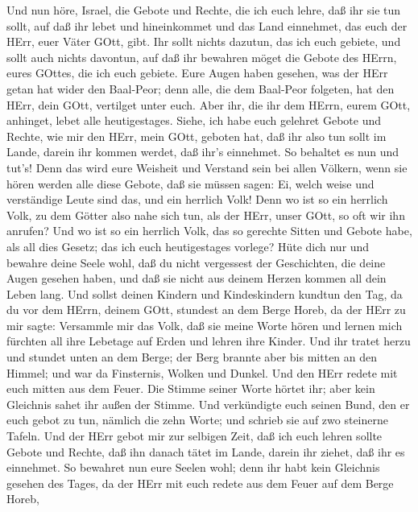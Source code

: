  Und nun höre, Israel, die Gebote und Rechte, die ich euch
lehre, daß ihr sie tun sollt, auf daß ihr lebet und hineinkommet und das
Land einnehmet, das euch der HErr, euer Väter GOtt, gibt. 
Ihr sollt nichts dazutun, das ich euch gebiete, und sollt auch nichts
davontun, auf daß ihr bewahren möget die Gebote des HErrn, eures GOttes,
die ich euch gebiete.  Eure Augen haben gesehen, was der
HErr getan hat wider den Baal-Peor; denn alle, die dem Baal-Peor
folgeten, hat den HErr, dein GOtt, vertilget unter euch. 
Aber ihr, die ihr dem HErrn, eurem GOtt, anhinget, lebet alle
heutigestages.  Siehe, ich habe euch gelehret Gebote und
Rechte, wie mir den HErr, mein GOtt, geboten hat, daß ihr also tun sollt
im Lande, darein ihr kommen werdet, daß ihr's einnehmet.  So
behaltet es nun und tut's! Denn das wird eure Weisheit und Verstand sein
bei allen Völkern, wenn sie hören werden alle diese Gebote, daß sie
müssen sagen: Ei, welch weise und verständige Leute sind das, und ein
herrlich Volk!  Denn wo ist so ein herrlich Volk, zu dem
Götter also nahe sich tun, als der HErr, unser GOtt, so oft wir ihn
anrufen?  Und wo ist so ein herrlich Volk, das so gerechte
Sitten und Gebote habe, als all dies Gesetz; das ich euch heutigestages
vorlege?  Hüte dich nur und bewahre deine Seele wohl, daß du
nicht vergessest der Geschichten, die deine Augen gesehen haben, und daß
sie nicht aus deinem Herzen kommen all dein Leben lang. Und sollst
deinen Kindern und Kindeskindern kundtun  den Tag, da du
vor dem HErrn, deinem GOtt, stundest an dem Berge Horeb, da der HErr zu
mir sagte: Versammle mir das Volk, daß sie meine Worte hören und lernen
mich fürchten all ihre Lebetage auf Erden und lehren ihre Kinder.
 Und ihr tratet herzu und stundet unten an dem Berge; der
Berg brannte aber bis mitten an den Himmel; und war da Finsternis,
Wolken und Dunkel.  Und den HErr redete mit euch mitten aus
dem Feuer. Die Stimme seiner Worte hörtet ihr; aber kein Gleichnis sahet
ihr außen der Stimme.  Und verkündigte euch seinen Bund,
den er euch gebot zu tun, nämlich die zehn Worte; und schrieb sie auf
zwo steinerne Tafeln.  Und der HErr gebot mir zur selbigen
Zeit, daß ich euch lehren sollte Gebote und Rechte, daß ihn danach tätet
im Lande, darein ihr ziehet, daß ihr es einnehmet.  So
bewahret nun eure Seelen wohl; denn ihr habt kein Gleichnis gesehen des
Tages, da der HErr mit euch redete aus dem Feuer auf dem Berge Horeb,
